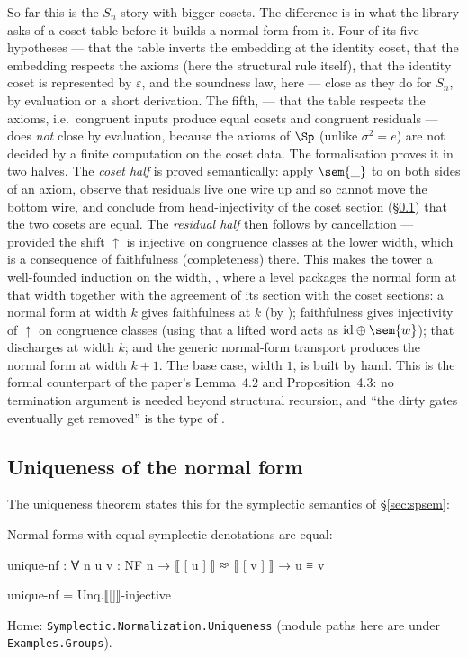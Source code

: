 So far this is the $S_n$ story with bigger cosets.  The difference is in
what the library asks of a coset table before it builds a normal form
from it.  Four of its five hypotheses --- that the table inverts the
embedding at the identity coset, that the embedding respects the axioms
(here the structural rule  itself), that the identity coset
is represented by $\varepsilon$, and the soundness law, here
 --- close as they do for $S_n$, by evaluation or a
short derivation.  The fifth,  --- that the table respects
the axioms, i.e.\ congruent inputs produce equal cosets and congruent
residuals --- does \emph{not} close by evaluation, because the axioms of $\Sp$ (unlike
$\sigma^2 = e$) are not decided by a finite computation on the coset
data.  The formalisation proves it in two halves.  The \emph{coset half}
is proved semantically: apply $\sem{\_}$ to  on both
sides of an axiom, observe that residuals live one wire up and so cannot
move the bottom wire, and conclude from head-injectivity of the coset
section (\S\ref{sec:uniqueness}) that the two cosets are equal.  The
\emph{residual half} then follows by cancellation --- provided the shift
$\uparrow$ is injective on congruence classes at the lower width, which
is a consequence of faithfulness (completeness) there.  This makes the
tower a well-founded induction on the width, , where a level packages the normal form at that width
together with the agreement of its section with the coset sections: a
normal form at width $k$ gives faithfulness at $k$ (by
); faithfulness gives injectivity of $\uparrow$
on congruence classes (using that a lifted word acts as $\mathrm{id}
\oplus \sem{w}$); that discharges  at width $k$; and the
generic normal-form transport produces the normal form at width
$k{+}1$.  The base case, width $1$, is built by hand.  This is the
formal counterpart
of the paper's Lemma~4.2 and Proposition~4.3: no termination argument is
needed beyond structural recursion, and ``the dirty gates eventually get
removed'' is the type of .

\subsection{Uniqueness of the normal form}\label{sec:uniqueness}

The uniqueness theorem states this for the symplectic semantics of
\S\ref{sec:spsem}:

\begin{theorem}\label{thm:unique}
Normal forms with equal symplectic denotations are equal:
\begin{code}
unique-nf : ∀ n {u v : NF n} → ⟦ [ u ] ⟧ ≈ˢ ⟦ [ v ] ⟧ → u ≡ v
\end{code}
\begin{code}[hide]
unique-nf = Unq.⟦[]⟧-injective
\end{code}
\noindent Home: \texttt{Symplectic.Normalization.Uniqueness} (module
paths here are under \texttt{Examples.Groups}).
\end{theorem}

